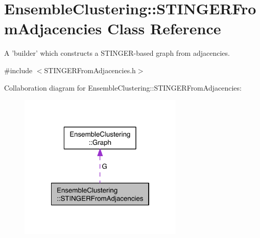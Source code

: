\hypertarget{class_ensemble_clustering_1_1_s_t_i_n_g_e_r_from_adjacencies}{\section{Ensemble\-Clustering\-:\-:S\-T\-I\-N\-G\-E\-R\-From\-Adjacencies Class Reference}
\label{class_ensemble_clustering_1_1_s_t_i_n_g_e_r_from_adjacencies}
}


A 'builder' which constructs a S\-T\-I\-N\-G\-E\-R-\/based graph from adjacencies.  




{\ttfamily \#include $<$S\-T\-I\-N\-G\-E\-R\-From\-Adjacencies.\-h$>$}



Collaboration diagram for Ensemble\-Clustering\-:\-:S\-T\-I\-N\-G\-E\-R\-From\-Adjacencies\-:\nopagebreak
\begin{figure}[H]
\begin{center}
\leavevmode
\includegraphics[width=222pt]{class_ensemble_clustering_1_1_s_t_i_n_g_e_r_from_adjacencies__coll__graph}
\end{center}
\end{figure}

